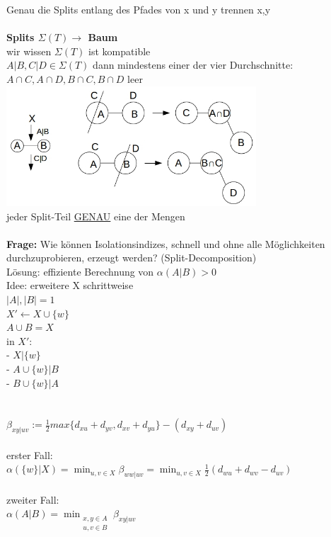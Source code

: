 Genau die Splits entlang des Pfades von x und y trennen x,y
\\\\
\textbf{Splits $\Sigma(T) \rightarrow$ Baum}\\
wir wissen $\Sigma(T)$ ist kompatible\\
$A|B,C|D \in \Sigma(T)$ dann mindestens einer der vier Durchschnitte:\\ $A \cap C, A \cap D, B \cap C, B \cap D$ leer\\
\includegraphics[width=0.7\textwidth]{lectures/161216/pix/3.jpg}\\
jeder Split-Teil \underline{GENAU} eine der Mengen\\\\
\textbf{Frage:} Wie können Isolationsindizes, schnell und ohne alle Möglichkeiten durchzuprobieren, erzeugt werden? (Split-Decomposition)\\
Lösung: effiziente Berechnung von $\alpha(A|B)>0$\\
Idee: erweitere X schrittweise\\
$|A|,|B|=1$\\
$X' \leftarrow X \cup \{w\}$\\
$A\cup B=X$\\
in $X':$\\
- \hspace{10pt}$X|\{w\}$\\
- \hspace{10pt}$A\cup \{w\}|B$\\
- \hspace{10pt}$B\cup \{w\}|A$\\
\\\\
$\beta_{xy|uv}:=\frac{1}{2}max\{d_{xu} + d_{yv}, d_{xv} + d_{yu}\} - (d_{xy} + d_{uv})$\\\\
erster Fall:\\
$\alpha(\{w\}|X)=\displaystyle\min_{u,v \in X}\beta_{ww|uv}=\displaystyle\min_{u,v \in X} \frac{1}{2}(d_{wu} + d_{wv} - d_{uv})$\\\\
zweiter Fall:\\
$\alpha(A|B)=\displaystyle\min_{\substack{x,y \in A \\ u,v \in B}}\beta_{xy|uv}$\\

